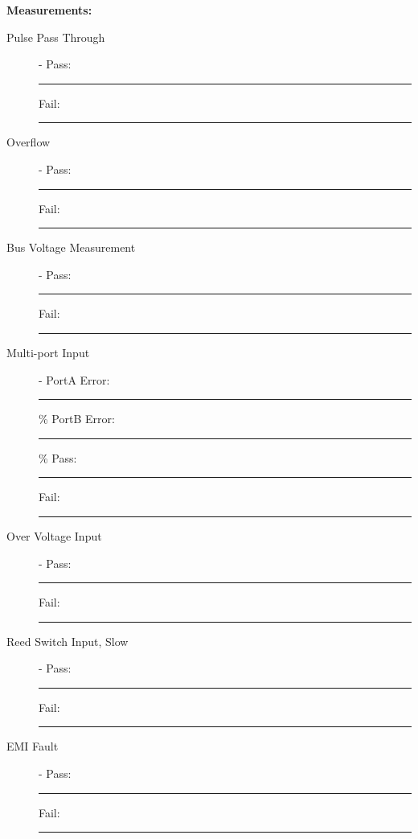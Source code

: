 {\Large \textbf{Measurements:}}\\[5pt]
\begin{description}
\item [Pulse Pass Through] - \hfill Pass: \rule{1cm}{0.15mm} \hspace{0.5cm} Fail: \rule{1cm}{0.15mm}
\item [Overflow] -  \hfill Pass: \rule{1cm}{0.15mm} \hspace{0.5cm} Fail: \rule{1cm}{0.15mm}
\item [Bus Voltage Measurement] -  \hfill Pass: \rule{1cm}{0.15mm} \hspace{0.5cm} Fail: \rule{1cm}{0.15mm}
\item [Multi-port Input] - PortA Error: \rule{1cm}{0.15mm} \% \hspace{0.5cm} PortB Error: \rule{1cm}{0.15mm} \% \hfill Pass: \rule{1cm}{0.15mm} \hspace{0.5cm} Fail: \rule{1cm}{0.15mm}
\item [Over Voltage Input] -  \hfill Pass: \rule{1cm}{0.15mm} \hspace{0.5cm} Fail: \rule{1cm}{0.15mm}
\item [Reed Switch Input, Slow] -  \hfill Pass: \rule{1cm}{0.15mm} \hspace{0.5cm} Fail: \rule{1cm}{0.15mm}
\item [EMI Fault] -  \hfill Pass: \rule{1cm}{0.15mm} \hspace{0.5cm} Fail: \rule{1cm}{0.15mm}
\end{description}

